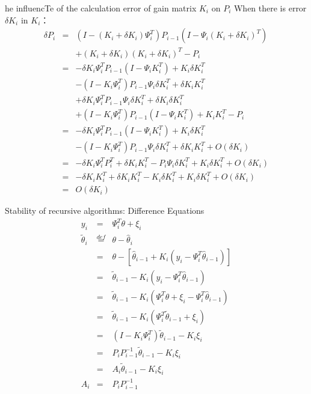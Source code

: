\begin{frame}{he influencTe of the calculation error of gain matrix $K_i$ on $P_i$}
When there is error $\delta K_i$ in $K_i$：
\begin{eqnarray*}
\delta P_i  &=& (I-(K_i+\delta K_i)\Psi_i^T)P_{i-1} (I-\Psi_i (K_i+\delta K_i)^T) \\
&& +(K_i+\delta K_i) (K_i+\delta K_i)^T -P_i  \\
 &=& -\delta K_i\Psi_i^T P_{i-1} (I-\Psi_i K_i^T)+K_i \delta K_i^T  \\
 && -(I-K_i\Psi_i^T)P_{i-1} \Psi_i \delta K_i^T+\delta K_i K_i^T   \\
 && + \delta K_i\Psi_i^T P_{i-1} \Psi_i \delta K_i^T+\delta K_i \delta K_i^T  \\
 && +(I-K_i\Psi_i^T)P_{i-1} (I-\Psi_i K_i^T)+K_i K_i^T -P_i  \\
 &=& -\delta K_i\Psi_i^T P_{i-1} (I-\Psi_i K_i^T)+K_i \delta K_i^T  \\
 && -(I-K_i\Psi_i^T)P_{i-1} \Psi_i \delta K_i^T+\delta K_i K_i^T  +O(\delta K_i) \\
 &=& -\delta K_i\Psi_i^T P_i^T+\delta K_i K_i^T -P_i \Psi_i \delta K_i^T+ K_i \delta K_i^T +O(\delta K_i) \\
 &=& -\delta K_i K_i^T +\delta K_i K_i^T -K_i \delta K_i^T+ K_i \delta K_i^T +O(\delta K_i) \\
 &=& O(\delta K_i) 
\end{eqnarray*}
\end{frame}

\begin{frame}{ Stability of recursive algorithms: Difference Equations }
\begin{eqnarray*}
y_i &=& \Psi_i^T \theta+\xi_i \\
\tilde\theta_i &\stackrel{def}{=}&\theta-\hat\theta_i \\
&=& \theta-[\hat\theta_{i-1} + K_i (y_i-\Psi_i^T\hat\theta_{i-1})] \\
&=& \tilde\theta_{i-1}-K_i (y_i-\Psi_i^T\hat\theta_{i-1}) \\
&=& \tilde\theta_{i-1}-K_i (\Psi_i^T\theta + \xi_i -\Psi_i^T\hat\theta_{i-1}) \\
&=& \tilde\theta_{i-1}-K_i (\Psi_i^T\tilde\theta_{i-1} + \xi_i ) \\
&=& (I-K_i \Psi_i^T)\tilde\theta_{i-1} - K_i\xi_i \\
&=& P_i P_{i-1}^{-1}\tilde\theta_{i-1} - K_i\xi_i \\
&=& A_i \tilde\theta_{i-1} - K_i\xi_i \\
A_i &=& P_i P_{i-1}^{-1} 
\end{eqnarray*}
\end{frame}

